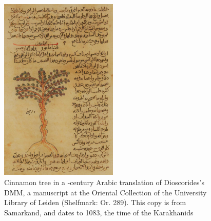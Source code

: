\begin{figure}
    \includegraphics[width=0.5\textwidth]{imgs/figs/cinnamon_manuscipt_cr.jpg}
  \caption[Cinnamon tree in a -century Arabic manuscript.]{Cinnamon tree in a -century Arabic translation of Dioscorides's \gls{DMM}, a manuscript at the Oriental Collection of the University Library of Leiden (Shelfmark: Or. 289). This copy is from Samarkand, and dates to 1083, the time of the Karakhanids \parencite[f. 9a]{dioscorides_kitab_1083}}
\label{fig:cinnamon_manuscript}
\end{figure}


